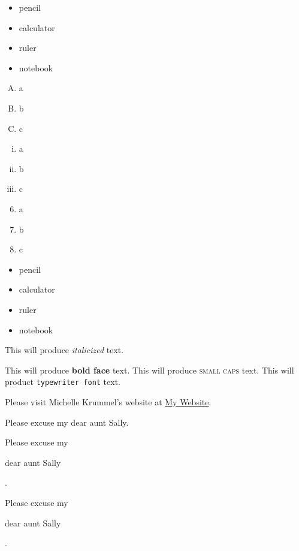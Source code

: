\documentclass[11pt, a4paper]{article}
\newcommand{\set}[1]{\setlength\itemsep{#1em}}
\begin{document}
\begin{itemize}
    \item pencil
    \item calculator
    \item ruler
    \item notebook
\end{itemize}

\begin{enumerate}[A.]
    \item a
    \item b
    \item c
\end{enumerate}

\begin{enumerate}[i.]
\set{10}
    \item a
    \item b
    \item c
\end{enumerate}

\pagebreak

\begin{enumerate}\setcounter{enumi}{5}
    \item a
    \item b
    \item c
\end{enumerate}

\begin{itemize}
    \item[] pencil
    \item[] calculator
    \item[] ruler
    \item[] notebook
\end{itemize}

\pagebreak

This will produce \textit{italicized} text. 

This will produce \textbf{bold face} text.
This will produce \textsc{small caps} text. 
This will product \texttt{typewriter font} text.

Please visit Michelle Krummel's website at \href{http://michellekrummel.com}{My Website}.

Please excuse my dear aunt Sally. 

Please excuse my \begin{Large}dear aunt Sally\end{Large}.

Please excuse my \begin{large}dear aunt Sally\end{large}. 
\end{document}

